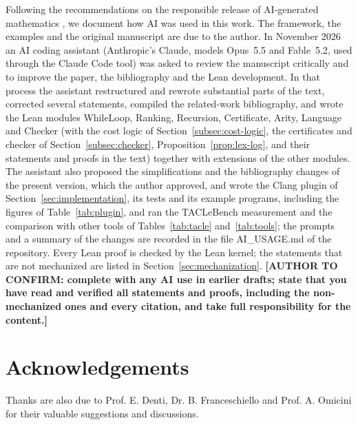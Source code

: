 \documentclass[oneside,english]{amsart}
\numberwithin{equation}{section}
\numberwithin{figure}{section}
\theoremstyle{plain}
\theoremstyle{definition}
\theoremstyle{plain}
\theoremstyle{remark}
\theoremstyle{plain}
\theoremstyle{definition}
\theoremstyle{plain}
\theoremstyle{remark}
\newcommand{\lean}[1]{{\ttfamily\small #1}}
\newcommand{\authortodo}[1]{\textbf{[AUTHOR TO CONFIRM: #1]}}
\begin{document}
Following the recommendations on the responsible release of AI-generated mathematics \cite{agmai2026responsible}, we document how AI was used in this work. The framework, the examples and the original manuscript are due to the author. In November 2026 an AI coding assistant (Anthropic's Claude, models Opus~5.5 and Fable~5.2, used through the Claude Code tool) was asked to review the manuscript critically and to improve the paper, the bibliography and the Lean development. In that process the assistant restructured and rewrote substantial parts of the text, corrected several statements, compiled the related-work bibliography, and wrote the Lean modules \lean{WhileLoop}, \lean{Ranking}, \lean{Recursion}, \lean{Certificate}, \lean{Arity}, \lean{Language} and \lean{Checker} (with the cost logic of Section~\ref{subsec:cost-logic}, the certificates and checker of Section~\ref{subsec:checker}, Proposition~\ref{prop:lex-log}, and their statements and proofs in the text) together with extensions of the other modules. The assistant also proposed the simplifications and the bibliography changes of the present version, which the author approved, and wrote the Clang plugin of Section~\ref{sec:implementation}, its tests and its example programs, including the figures of Table~\ref{tab:plugin}, and ran the TACLeBench measurement and the comparison with other tools of Tables~\ref{tab:tacle} and~\ref{tab:tools}; the prompts and a summary of the changes are recorded in the file \lean{AI\_USAGE.md} of the repository. Every Lean proof is checked by the Lean kernel; the statements that are not mechanized are listed in Section~\ref{sec:mechanization}. \authortodo{complete with any AI use in earlier drafts; state that you have read and verified all statements and proofs, including the non-mechanized ones and every citation, and take full responsibility for the content.}

\section*{Acknowledgements}

Thanks are also due to Prof. E. Denti, Dr. B. Franceschiello and Prof.
A. Omicini for their valuable suggestions and discussions.



\end{document}
